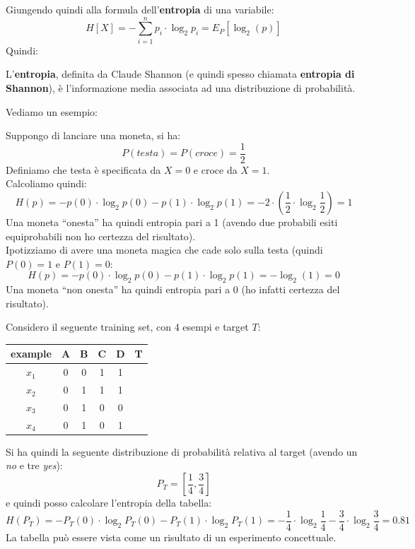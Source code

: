 \documentclass[a4paper,12pt, oneside]{book}
\begin{document}
Giungendo quindi alla formula dell'\textbf{entropia} di una variabile:
\[H[X]=-\sum_{i=1}^n p_i\cdot\log_2 p_i=E_P[\log_2(p)]\]
Quindi:
\begin{definizione}
  L'\textbf{entropia}, definita da Claude Shannon (e quindi spesso chiamata
  \textbf{entropia di Shannon}), è l'informazione media associata ad
  una distribuzione di probabilità.
\end{definizione}
Vediamo un esempio:
\begin{esempio}
  Suppongo di lanciare una moneta, si ha:
  \[P(testa)=P(croce)=\frac{1}{2}\]
  Definiamo che testa è specificata da $X=0$ e croce da $X=1$.\\
  Calcoliamo quindi:
  \[H(p)=-p(0)\cdot \log_2 p(0)-p(1)\cdot\log_2
    p(1)=-2\cdot(\frac{1}{2}\cdot\log_2\frac{1}{2})=1\] 
  Una moneta ``onesta'' ha quindi entropia pari a 1 (avendo due probabili esiti
  equiprobabili non ho certezza del risultato).\\
  Ipotizziamo di avere una moneta magica che cade solo sulla testa (quindi
  $P(0)=1$ e $P(1)=0$:
  \[H(p)=-p(0)\cdot \log_2 p(0)-p(1)\cdot\log_2 p(1)=-\log_2 (1)=0\]
  Una moneta ``non onesta'' ha quindi entropia pari a 0 (ho infatti certezza del
  risultato).
\end{esempio}
\begin{esempio}
  Considero il seguente training set, con 4 esempi e target $T$:
  \begin{table}[H]
    \centering
    \begin{tabular}{c|c|c|c|c|c}
      example & A & B & C & D & T\\
      \hline
      $x_1$ & 0 & 0 & 1 & 1 & \color{darkgreen}{1}\\
      $x_2$ & 0 & 1 & 1 & 1 & \color{darkgreen}{1}\\
      $x_3$ & 0 & 1 & 0 & 0 & \color{red}{0}\\
      $x_4$ & 0 & 1 & 0 & 1 & \color{darkgreen}{1}\\
    \end{tabular}
  \end{table}
  Si ha quindi la seguente distribuzione di probabilità relativa al target
  (avendo un \textit{no} e tre \textit{yes}):
  \[P_T=\left[\frac{1}{4},\frac{3}{4}\right]\]
  e quindi posso calcolare l'entropia della tabella:
  \[H(P_T)=-P_T(0)\cdot \log_2 P_T(0)-P_T(1)\cdot\log_2
    P_T(1)=-\frac{1}{4}\cdot\log_2\frac{1}{4}-\frac{3}{4}\cdot\log_2
    \frac{3}{4}= 0.81\]
  La tabella può essere vista come un risultato di un esperimento concettuale.
\end{esempio}
\end{document}

